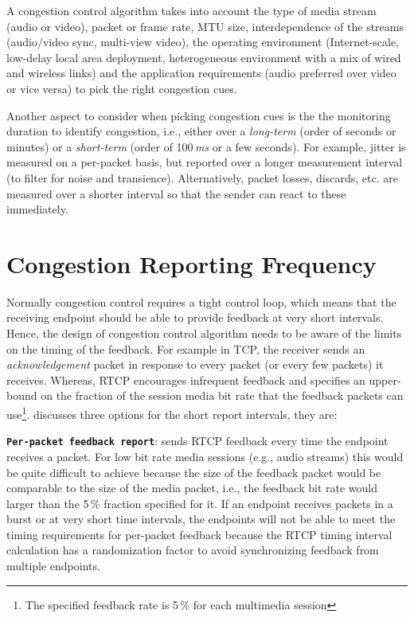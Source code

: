 A congestion control algorithm takes into account the type of media stream
(audio or video), packet or frame rate, MTU size, interdependence of the
streams (audio/video sync, multi-view video), the operating environment
(Internet-scale, low-delay local area deployment, heterogeneous environment
with a mix of wired and wireless links) and the application requirements
(audio preferred over video or vice versa) to pick the right congestion cues.

Another aspect to consider when picking congestion cues is the the monitoring
duration to identify congestion, i.e., either over a \emph{long-term} (order
of seconds or minutes) or a \emph{short-term} (order of 100\,\emph{ms} or a
few seconds). For example, jitter is measured on a per-packet basis, but
reported over a longer measurement interval (to filter for noise and
transience). Alternatively, packet losses, discards, etc. are measured over a
shorter interval so that the sender can react to these immediately.

\section{Congestion Reporting Frequency}
\label{fw.freq}

Normally congestion control requires a tight control loop, which means that
the receiving endpoint should be able to provide feedback at very short
intervals. Hence, the design of congestion control algorithm needs to be aware
of the limits on the timing of the feedback. For example in TCP, the receiver
sends an \emph{acknowledgement} packet in response to every packet (or every
few packets) it receives. Whereas, RTCP encourages infrequent feedback and
specifies an upper-bound on the fraction of the session media bit rate that
the feedback packets can use\footnote{The specified feedback rate is 5\,\% for
each multimedia session}. \cite{draft.rmcat.feedback} discusses three options
for the short report intervals, they are:

\textbf{\texttt{Per-packet feedback report}}: sends RTCP feedback every time
the endpoint receives a packet. For low bit rate media sessions (e.g., audio
streams) this would be quite difficult to achieve because the size of the
feedback packet would be comparable to the size of the media packet, i.e., the
feedback bit rate would larger than the 5\,\% fraction specified for it. If an
endpoint receives packets in a burst or at very short time intervals, the
endpoints will not be able to meet the timing requirements for per-packet
feedback because the RTCP timing interval calculation has a randomization
factor to avoid synchronizing feedback from multiple endpoints.

